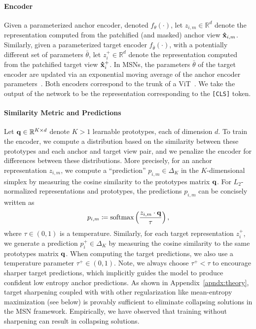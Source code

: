 \documentclass{article}
\newcommand{\defeq}{\coloneqq}
\newcommand{\R}{\mathbb{R}}
\begin{document}
\paragraph{Encoder}
Given a parameterized anchor encoder, denoted $f_\theta(\cdot)$, let $z_{i,m} \in \R^{d}$ denote the representation computed from the patchified (and masked) anchor view ${\bf \hat{x}}_{i,m}$.
Similarly, given a parameterized target encoder $f_{\bar{\theta}}(\cdot)$, with a potentially different set of parameters $\bar{\theta}$, let $z^+_i \in \R^{d}$ denote the representation computed from the patchified target view ${\bf \hat{x}}^+_i$.
In MSNs, the parameters $\bar{\theta}$ of the target encoder are updated via an exponential moving average of the anchor encoder parameters~\citep{grill2020bootstrap}.
Both encoders correspond to the trunk of a ViT~\citep{dosovitskiy2020image}.
We take the output of the network to be the representation corresponding to the {\tt [CLS]} token.

\paragraph{Similarity Metric and Predictions}
Let ${\bf q} \in \R^{K \times d}$ denote $K > 1$ learnable prototypes, each of dimension $d$.
To train the encoder, we compute a distribution based on the similarity between these prototypes and each anchor and target view pair, and we penalize the encoder for differences between these distributions.
More precisely, for an anchor representation $z_{i,m}$, we compute a ``prediction'' $p_{i,m} \in \Delta_K$ in the $K$-dimensional simplex by measuring the cosine similarity to the prototypes matrix ${\bf q}$.
For $L_2$-normalized representations and prototypes, the predictions $p_{i,m}$ can be concisely written as
\[
    p_{i,m} \defeq \text{softmax}\left( \frac{z_{i,m} \cdot {\bf q}}{\tau} \right),
\]
where $\tau \in (0, 1)$ is a temperature.
Similarly, for each target representation $z^+_i$, we generate a prediction $p^+_i \in \Delta_K$ by measuring the cosine similarity to the same prototypes matrix ${\bf q}$.
When computing the target predictions, we also use a temperature parameter $\tau^+  \in (0, 1)$.
Note, we always choose $\tau^+ < \tau$ to encourage sharper target predictions, which implicitly guides the model to produce confident low entropy anchor predictions.
As shown in Appendix~\ref{apndx:theory}, target sharpening coupled with with other regularization like mean-entropy maximization (see below) is provably sufficient to eliminate collapsing solutions in the MSN framework.
Empirically, we have observed that training without sharpening can result in collapsing solutions.
\end{document}

